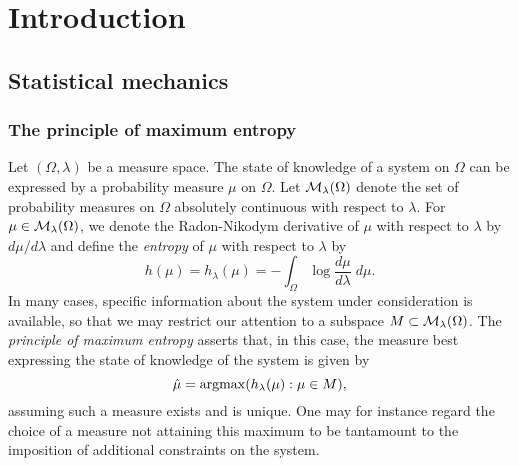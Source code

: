 
\chapter{Introduction}


\section{Statistical mechanics}


\subsection{The principle of maximum entropy}

Let $(\Omega, \lambda)$ be a measure space. The state of knowledge of a system on $\Omega$ can be expressed by a probability measure $\mu$ on $\Omega$. Let
$\mathcal{M}_\lambda(\Omega)$ denote the set of probability measures on $\Omega$ absolutely continuous with respect to $\lambda$. For
$\mu \in \mathcal{M}_\lambda(\Omega)$, we denote the Radon-Nikodym derivative of
$\mu$ with respect to $\lambda$ by $d\mu/d\lambda$ and define the
\emph{entropy} of $\mu$ with respect to $\lambda$ by
\begin{equation}
h(\mu) = h_\lambda(\mu) = -\int_\Omega \log\frac{d\mu}{d\lambda} \; d\mu.
\end{equation}
In many cases, specific information about the system under consideration is available, so that we may restrict our attention to a subspace $M \subset \mathcal{M}_\lambda(\Omega)$.
The \emph{principle of maximum entropy} \cite{Jaynes57} asserts that, in this
case, the measure best expressing the state of knowledge of the system is given by
\begin{equation}
\hat\mu = \operatorname*{argmax}(h_\lambda(\mu) : \mu \in M),
\end{equation}
assuming such a measure exists and is unique. One may for instance regard the choice of a measure not attaining this maximum to be tantamount to the imposition of additional constraints on the system.

